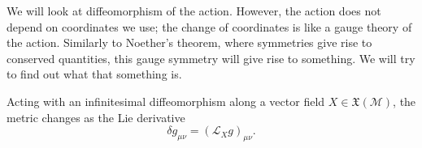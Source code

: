 We will look at diffeomorphism of the action. However, the action does not depend on coordinates we use; the change of coordinates is like a gauge theory of the action. Similarly to Noether's theorem, where symmetries give rise to conserved quantities, this gauge symmetry will give rise to something. We will try to find out what that something is.

\begin{claim}
  Acting with an infinitesimal diffeomorphism along a vector field $X \in \mathfrak{X}(\mathcal{M})$, the metric changes as the Lie derivative
  \begin{equation}
    \delta g_{\mu\nu} = (\mathcal{L}_X g)_{\mu\nu}.
  \end{equation}
\end{claim}
